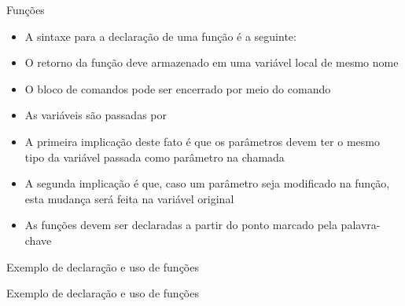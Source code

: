 \begin{frame}[fragile]{Funções}

    \begin{itemize}
        \item A sintaxe para a declaração de uma função é a seguinte:


        \item O retorno da função deve armazenado em uma variável local de mesmo nome 

        \item O bloco de comandos pode ser encerrado por meio do comando 

        \item As variáveis são passadas por 

        \item A primeira implicação deste fato é que os parâmetros devem ter o mesmo tipo da
            variável passada como parâmetro na chamada

        \item A segunda implicação é que, caso um parâmetro seja modificado na função, esta
            mudança será feita na variável original

        \item As funções devem ser declaradas a partir do ponto marcado pela palavra-chave
    \end{itemize}

\end{frame}

\begin{frame}[fragile]{Exemplo de declaração e uso de funções}
\end{frame}

\begin{frame}[fragile]{Exemplo de declaração e uso de funções}
\end{frame}

